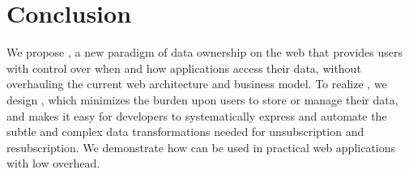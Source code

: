\section{Conclusion}
We propose \name, a new paradigm of data ownership on the web that provides users with control over
when and how applications access their data, without overhauling the current web architecture and
business model. To realize \name, we design \sys, which minimizes the burden upon users to store or
manage their data, and makes it easy for developers to systematically express and automate the
subtle and complex data transformations needed for unsubscription and resubscription. We demonstrate
how \sys can be used in practical web applications with low overhead.


